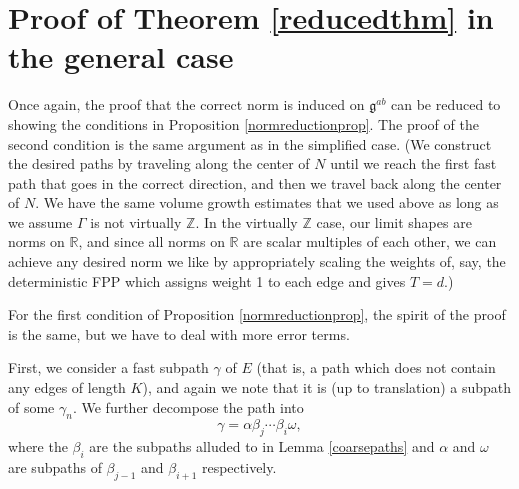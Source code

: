 \documentclass[12pt,reqno]{article}
\numberwithin{equation}{section}
\newcommand{\R}{\mathbb{R}}
\newcommand{\Z}{\mathbb{Z}}
\newcommand{\g}{\mathfrak{g}}
\begin{document}
\section{Proof of Theorem \ref{reducedthm} in the general case}
Once again, the proof that the correct norm is induced on $\g^{ab}$ can be reduced to showing the conditions in Proposition 
\ref{normreductionprop}. The proof of the second condition is the same argument as in the simplified case.
(We construct the desired paths by traveling along the center of $N$ until we reach the first fast path that goes in the correct direction,
and then we travel back along the center of $N$.
 We have the same volume growth estimates that we used above as long as 
we assume $\Gamma$ is not virtually $\Z$. In the virtually $\Z$ case, our limit shapes are norms on $\R$, and since all norms on
$\R$ are scalar multiples of each other, we can achieve any desired norm we like by appropriately scaling the weights of, say,
the deterministic FPP which assigns weight 1 to each edge and gives $T=d$.)

For the first condition of Proposition \ref{normreductionprop}, the spirit of the proof is the same, but we have to deal with more error terms.

First, we consider a fast subpath $\gamma$ of $E$ (that is, a path which does not contain any edges of length $K$), and again we note that
it is (up to translation) a subpath of some $\gamma_n$. We further decompose the path into
\[
   \gamma = \alpha \beta_j \cdots \beta_i \omega,
\]
where the $\beta_i$ are the subpaths alluded to in Lemma \ref{coarsepaths} and $\alpha$ and $\omega$ are subpaths of
$\beta_{j-1}$ and $\beta_{i+1}$ respectively.
\end{document}
